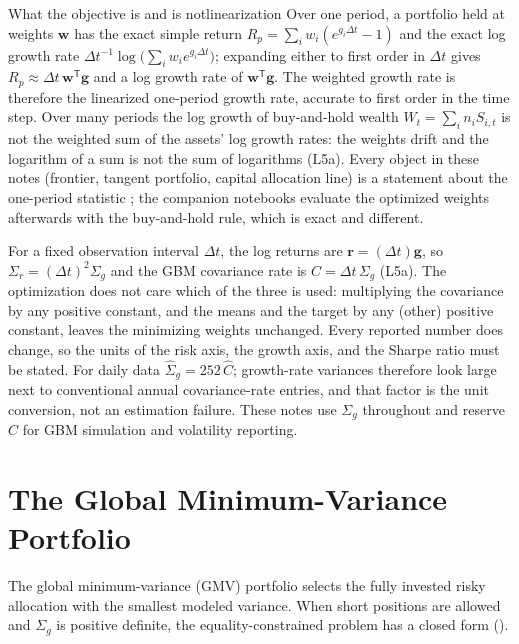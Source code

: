 \documentclass[11pt]{article}
\begin{document}
\begin{remark}{What the objective is and is not}{linearization}
Over one period, a portfolio held at weights $\mathbf w$ has the exact simple return $R_p=\sum_iw_i(e^{g_i\Delta t}-1)$ and the exact log growth rate $\Delta t^{-1}\log\bigl(\sum_iw_ie^{g_i\Delta t}\bigr)$; expanding either to first order in $\Delta t$ gives $R_p\approx\Delta t\,\mathbf w^{\mathsf T}\mathbf g$ and a log growth rate of $\mathbf w^{\mathsf T}\mathbf g$. The weighted growth rate is therefore the linearized one-period growth rate, accurate to first order in the time step. Over many periods the log growth of buy-and-hold wealth $W_t=\sum_in_iS_{i,t}$ is not the weighted sum of the assets' log growth rates: the weights drift and the logarithm of a sum is not the sum of logarithms (L5a). Every object in these notes (frontier, tangent portfolio, capital allocation line) is a statement about the one-period statistic ; the companion notebooks evaluate the optimized weights afterwards with the buy-and-hold rule, which is exact and different.
\end{remark}

For a fixed observation interval $\Delta t$, the log returns are $\mathbf r=(\Delta t)\mathbf g$, so $\Sigma_r=(\Delta t)^2\Sigma_g$ and the GBM covariance rate is $C=\Delta t\,\Sigma_g$ (L5a). The optimization does not care which of the three is used: multiplying the covariance by any positive constant, and the means and the target by any (other) positive constant, leaves the minimizing weights unchanged. Every reported number does change, so the units of the risk axis, the growth axis, and the Sharpe ratio must be stated. For daily data $\widehat\Sigma_g=252\,\widehat C$; growth-rate variances therefore look large next to conventional annual covariance-rate entries, and that factor is the unit conversion, not an estimation failure. These notes use $\Sigma_g$ throughout and reserve $C$ for GBM simulation and volatility reporting.

\section{The Global Minimum-Variance Portfolio}

The global minimum-variance (GMV) portfolio selects the fully invested risky allocation with the smallest modeled variance. When short positions are allowed and $\Sigma_g$ is positive definite, the equality-constrained problem has a closed form ().
\end{document}
